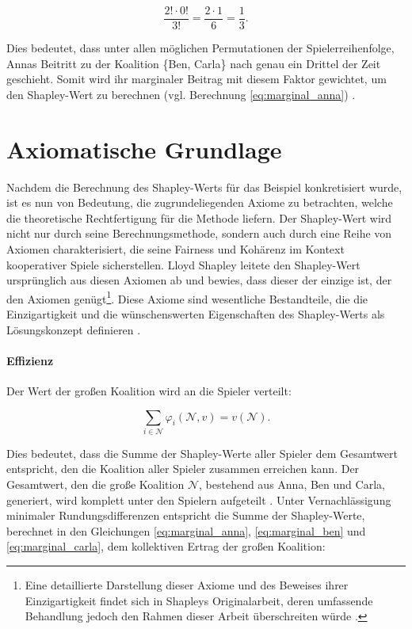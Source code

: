 \begin{equation}
\frac{2! \cdot 0!}{3!} = \frac{2 \cdot 1}{6} = \frac{1}{3}.
\end{equation}

Dies bedeutet, dass unter allen möglichen Permutationen der Spielerreihenfolge, Annas Beitritt zu der Koalition \{Ben, Carla\} 
nach genau ein Drittel der Zeit geschieht. Somit wird ihr marginaler Beitrag mit diesem Faktor gewichtet, 
um den Shapley-Wert zu berechnen (vgl. Berechnung \ref{eq:marginal_anna}) \cite[S. 21f]{Molnar_2023}.


\section{Axiomatische Grundlage}
\label{sec:axiome-shapley}

Nachdem die Berechnung des Shapley-Werts für das Beispiel konkretisiert wurde, ist es nun von Bedeutung, die zugrundeliegenden Axiome zu betrachten, 
welche die theoretische Rechtfertigung für die Methode liefern. Der Shapley-Wert wird nicht nur durch seine Berechnungsmethode, 
sondern auch durch eine Reihe von Axiomen charakterisiert, die seine Fairness und Kohärenz im Kontext kooperativer Spiele sicherstellen. 
Lloyd Shapley leitete den Shapley-Wert ursprünglich aus diesen Axiomen ab und bewies, 
dass dieser der einzige ist, der den Axiomen genügt\footnote{Eine detaillierte Darstellung dieser Axiome und des Beweises 
ihrer Einzigartigkeit findet sich in Shapleys Originalarbeit, deren umfassende Behandlung jedoch den Rahmen dieser Arbeit überschreiten würde \cite[S. 307-318]{Shapley+1953+307+318}.}. 
Diese Axiome sind wesentliche Bestandteile, die die Einzigartigkeit und die wünschenswerten Eigenschaften des Shapley-Werts als Lösungskonzept definieren \cite[S. 22]{Molnar_2023}. 

\paragraph{Effizienz}

Der Wert der großen Koalition wird an die Spieler verteilt:

\begin{equation}
\sum_{i \in \mathcal{N}} \varphi_i (\mathcal{N}, v) = v(\mathcal{N}).
\end{equation}

Dies bedeutet, dass die Summe der Shapley-Werte aller Spieler dem Gesamtwert entspricht, 
den die Koalition aller Spieler zusammen erreichen kann. Der Gesamtwert, den die große Koalition $\mathcal{N}$, 
bestehend aus Anna, Ben und Carla, generiert, wird komplett unter den Spielern aufgeteilt \cite[S. 22]{Molnar_2023}. 
Unter Vernachlässigung minimaler Rundungsdifferenzen entspricht die Summe der Shapley-Werte, 
berechnet in den Gleichungen \ref{eq:marginal_anna}, \ref{eq:marginal_ben} und \ref{eq:marginal_carla}, 
dem kollektiven Ertrag der großen Koalition:

